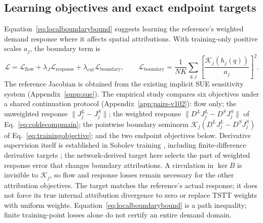 \subsection{Learning objectives and exact endpoint targets}\label{app:learning-objectives}
Equation~\eqref{eq:localboundarybound} suggests learning the reference's weighted demand response
where it affects spatial attributions. With training-only positive scales
$a_j$, the boundary term is
\begin{equation}
\mathcal L=\mathcal L_{\mathrm{flow}}+\lambda_J\mathcal L_{\mathrm{response}}
+\lambda_{\mathrm{cut}}\mathcal L_{\mathrm{boundary}},\qquad
\mathcal L_{\mathrm{boundary}}
=\frac1{NK}\sum_{q,j}\left[\frac{\mathcal K_j(h_j(q))}{a_j}\right]^2.
\label{eq:trainingobjective}
\end{equation}
The reference Jacobian is obtained from the existing implicit SUE
sensitivity system (Appendix~\ref{supp:sue}). The empirical study
compares six objectives under a shared continuation protocol
(Appendix~\ref{app:pairs-v102}): flow only; the unweighted response
$\|J_j^L-J_j^S\|$; the weighted response $\|D^LJ_j^L-D^SJ_j^S\|$ of
Eq.~\eqref{eq:coldecompmain}; the pointwise boundary seminorm
$\mathcal K_j(D^LJ_j^L-D^SJ_j^S)$ of Eq.~\eqref{eq:trainingobjective};
and the two endpoint objectives below.
Derivative supervision itself is established in Sobolev training
\citep{czarnecki2017sobolev}, including finite-difference derivative targets
\citep{yuan2022sobolev}; the network-derived target here selects the
part of weighted response error that changes boundary attributions.
A circulation in $\ker B$ is invisible to $\mathcal K_j$, so flow and
response losses remain necessary for the other attribution objectives.
The target matches the reference's actual response; it does not force
its true internal attribution divergence to zero or replace TSTT weights
with uniform weights. Equation~\eqref{eq:localboundarybound} is a path
inequality; finite training-point losses alone do not certify an entire
demand domain.


